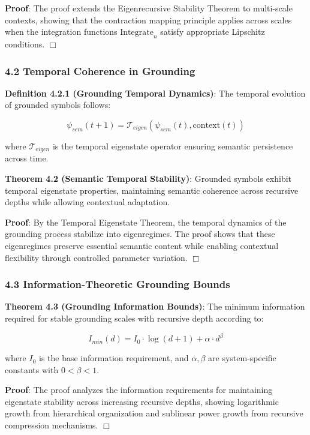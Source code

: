 \documentclass[
]{article}
\begin{document}
\textbf{Proof}: The proof extends the Eigenrecursive Stability Theorem
to multi-scale contexts, showing that the contraction mapping principle
applies across scales when the integration functions
\(\text{Integrate}_n\) satisfy appropriate Lipschitz conditions.
\(\Box \)

\subsubsection{4.2 Temporal Coherence in
Grounding}\label{temporal-coherence-in-grounding}

\textbf{Definition 4.2.1 (Grounding Temporal Dynamics)}: The temporal
evolution of grounded symbols follows:

\[\psi_{sem}(t+1) = \mathcal{T}_{eigen}(\psi_{sem}(t), \text{context}(t))\]

where \(\mathcal{T}_{eigen}\) is the temporal eigenstate operator
ensuring semantic persistence across time.

\textbf{Theorem 4.2 (Semantic Temporal Stability)}: Grounded symbols
exhibit temporal eigenstate properties, maintaining semantic coherence
across recursive depths while allowing contextual adaptation.

\textbf{Proof}: By the Temporal Eigenstate Theorem, the temporal
dynamics of the grounding process stabilize into eigenregimes. The proof
shows that these eigenregimes preserve essential semantic content while
enabling contextual flexibility through controlled parameter variation.
\(\Box \)

\subsubsection{4.3 Information-Theoretic Grounding
Bounds}\label{information-theoretic-grounding-bounds}

\textbf{Theorem 4.3 (Grounding Information Bounds)}: The minimum
information required for stable grounding scales with recursive depth
according to:

\[I_{min}(d) = I_0 \cdot \log(d + 1) + \alpha \cdot d^{\beta}\]

where \(I_0\) is the base information requirement, and \(\alpha, \beta\)
are system-specific constants with \(0 < \beta < 1\).

\textbf{Proof}: The proof analyzes the information requirements for
maintaining eigenstate stability across increasing recursive depths,
showing logarithmic growth from hierarchical organization and sublinear
power growth from recursive compression mechanisms. \(\Box \)
\end{document}
